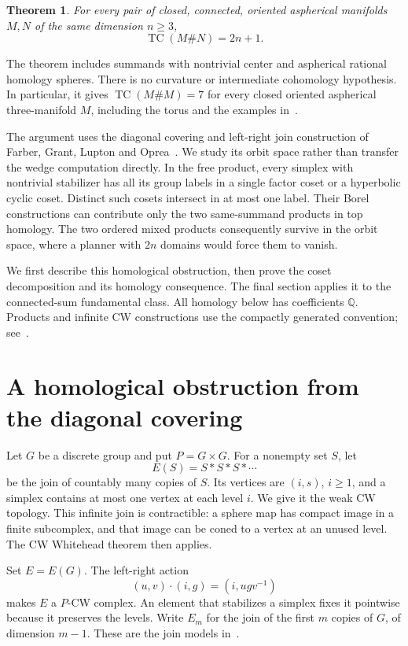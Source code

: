\documentclass[11pt]{article}
\newtheorem{theorem}{Theorem}[section]
\theoremstyle{remark}
\newcommand{\TC}{\operatorname{TC}}
\newcommand{\Q}{\mathbb{Q}}
\begin{document}
\begin{theorem}\label{thm:main}
For every pair of closed, connected, oriented aspherical manifolds \(M,N\)
of the same dimension \(n\geq3\),
\[
 \TC(M\#N)=2n+1.
\]
\end{theorem}

The theorem includes summands with nontrivial center and aspherical
rational homology spheres. There is no curvature or intermediate
cohomology hypothesis. In particular, it gives
\(\TC(M\#M)=7\) for every closed oriented aspherical three-manifold \(M\),
including the torus and the examples in~\cite[Question 5.10]{Neofytidis}.

The argument uses the diagonal covering and left-right join construction
of Farber, Grant, Lupton and Oprea~\cite{FGLO}. We study its orbit space
rather than transfer the wedge computation directly. In the free product,
every simplex with nontrivial stabilizer has all its group labels in a
single factor coset or a hyperbolic cyclic coset. Distinct such cosets
intersect in at most one label. Their Borel constructions can contribute
only the two same-summand products in top homology. The two ordered mixed
products consequently survive in the orbit space, where a planner with
\(2n\) domains would force them to vanish.

We first describe this homological obstruction, then prove the coset
decomposition and its homology consequence. The final section applies it
to the connected-sum fundamental class. All homology below has coefficients
\(\Q\). Products and infinite CW constructions use the compactly generated
convention; see~\cite[Chapters 5 and 10]{May}.

\section{A homological obstruction from the diagonal covering}

Let \(G\) be a discrete group and put \(P=G\times G\). For a nonempty set
\(S\), let
\[
 E(S)=S*S*S*\cdots
\]
be the join of countably many copies of \(S\). Its vertices are
\((i,s)\), \(i\geq1\), and a simplex contains at most one vertex at each
level \(i\). We give it the weak CW topology. This infinite join is
contractible: a sphere map has compact image in a finite subcomplex, and
that image can be coned to a vertex at an unused level. The CW Whitehead
theorem then applies.

Set \(E=E(G)\). The left-right action
\[
 (u,v)\cdot(i,g)=(i,ugv^{-1})
\]
makes \(E\) a \(P\)-CW complex. An element that stabilizes a simplex fixes
it pointwise because it preserves the levels. Write \(E_m\) for the join
of the first \(m\) copies of \(G\), of dimension \(m-1\).
These are the join models in~\cite[Sections 2.5--2.9]{FGLO}.
\end{document}
